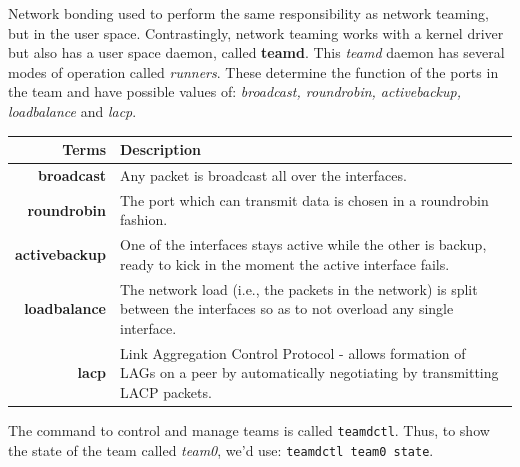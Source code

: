 Network bonding used to perform the same responsibility as network teaming, but in the user space. Contrastingly, network teaming works with a kernel driver but also has a user space daemon, called \textbf{teamd}. This \textit{teamd} daemon has several modes of operation called \textit{runners}. These determine the function of the ports in the team and have possible values of: \textit{broadcast, roundrobin, activebackup, loadbalance} and \textit{lacp}. 

\noindent
\begin{tabular}{rM{0.85}}
	\toprule
	\textbf{Terms} &\textbf{Description} \\
	\midrule
	\textbf{broadcast}	&Any packet is broadcast all over the interfaces.\\
	\midrule
	\textbf{roundrobin}	&The port which can transmit data is chosen in a roundrobin fashion.\\
	\midrule
	\textbf{activebackup}	&One of the interfaces stays active while the other is backup, ready to kick in the moment the active interface fails.\\
	\midrule
	\textbf{loadbalance}	&The network load (i.e., the packets in the network) is split between the interfaces so as to not overload any single interface.\\
	\midrule
	\textbf{lacp}	&Link Aggregation Control Protocol - allows formation of LAGs on a peer by automatically negotiating by transmitting LACP packets.\\
	\bottomrule
\end{tabular}

\noindent
The command to control and manage teams is called \verb|teamdctl|. Thus, to show the state of the team called \textit{team0}, we'd use: \verb|teamdctl team0 state|. 

